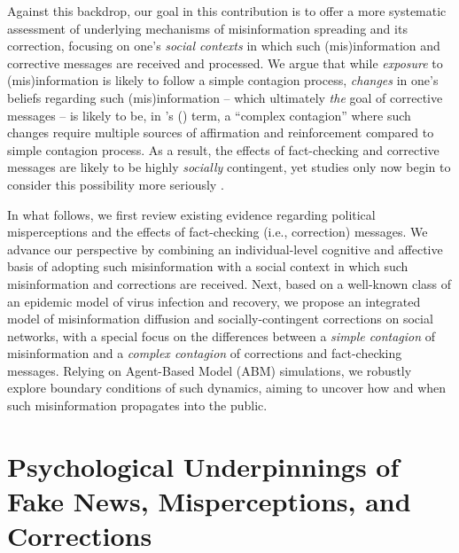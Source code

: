 \documentclass[man, 12pt, a4paper, nolmodern, noextraspace]{apa6}
\begin{document}
  Against this backdrop, our goal in this contribution is to offer a more systematic assessment of underlying mechanisms of misinformation spreading and its correction, focusing on one's \emph{social contexts} in which such (mis)information and corrective messages are received and processed. We argue that while \emph{exposure} to (mis)information is likely to follow a simple contagion process, \emph{changes} in one's beliefs regarding such (mis)information -- which ultimately \emph{the} goal of corrective messages -- is likely to be, in \citeauthor{centola2007complex}'s (\citeyear{centola2007complex}) term, a \enquote{complex contagion} where such changes require multiple sources of affirmation and reinforcement compared to simple contagion process. As a result, the effects of fact-checking and corrective messages are likely to be highly \emph{socially} contingent, yet studies only now begin to consider this possibility more seriously \parencite{margolin2017, bode2017see}.    
    
  In what follows, we first review existing evidence regarding political misperceptions and the effects of fact-checking (i.e., correction) messages. We advance our perspective by combining an individual-level cognitive and affective basis of adopting such misinformation with a social context in which such misinformation and corrections are received. Next, based on a well-known class of an epidemic model of virus infection and recovery, we propose an integrated model of misinformation diffusion and socially-contingent corrections on social networks, with a special focus on the differences between a \emph{simple contagion} of misinformation and a \emph{complex contagion} of corrections and fact-checking messages. Relying on Agent-Based Model (ABM) simulations, we robustly explore boundary conditions of such dynamics, aiming to uncover how and when such misinformation propagates into the public.
    
\section{Psychological Underpinnings of Fake News, Misperceptions, and Corrections}
\end{document}
